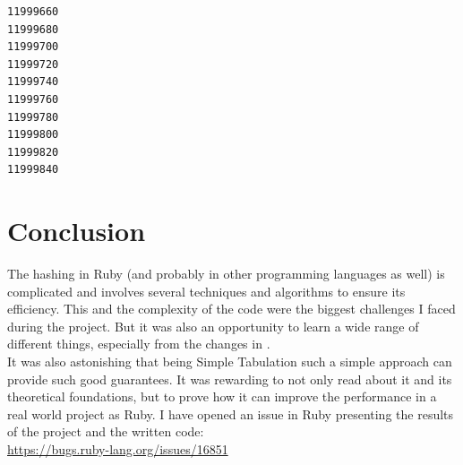 \documentclass[oneside, 12pt]{article}
\theoremstyle{break}
\begin{document}
\begin{lstlisting}
11999660
11999680
11999700
11999720
11999740
11999760
11999780
11999800
11999820
11999840
\end{lstlisting}


\section{Conclusion}

The hashing in Ruby (and probably in other programming languages as well) is complicated and involves several techniques and algorithms to ensure its efficiency.
This and the complexity of the code were the biggest challenges I faced during the project.
But it was also an opportunity to learn a wide range of different things, especially from the changes in \cite{ruby_code}.\\

It was also astonishing that being Simple Tabulation such a simple approach can provide such good guarantees.
It was rewarding to not only read about it and its theoretical foundations, but to prove how it can improve the performance in a real world project as Ruby.
I have opened an issue in Ruby presenting the results of the project and the written code:\\
\url{https://bugs.ruby-lang.org/issues/16851}


\printglossary[type=\acronymtype]



\end{document}
